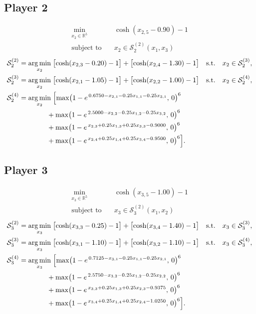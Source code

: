 \documentclass[11pt]{article}
\newcommand{\argmin}{\operatorname*{arg\,min}}
\begin{document}
\subsection*{Player 2}
\[
\begin{aligned}
  \min_{x_2 \in \mathbb{R}^5} \quad & \cosh(x_{2,5}-0.90)-1 \\
  \text{subject to} \quad & x_2 \in \mathcal{S}_2^{(2)}(x_1,x_3)
\end{aligned}
\]
\[
\begin{aligned}
  \mathcal{S}_2^{(2)} &= \argmin_{x_2} \;
    \bigl[\cosh(x_{2,3}-0.20)-1\bigr] + \bigl[\cosh(x_{2,4}-1.30)-1\bigr]
    \quad \text{s.t.} \quad x_2 \in \mathcal{S}_2^{(3)}, \\
  \mathcal{S}_2^{(3)} &= \argmin_{x_2} \;
    \bigl[\cosh(x_{2,1}-1.05)-1\bigr] + \bigl[\cosh(x_{2,2}-1.00)-1\bigr]
    \quad \text{s.t.} \quad x_2 \in \mathcal{S}_2^{(4)}, \\
  \mathcal{S}_2^{(4)} &= \argmin_{x_2} \;
    \Bigl[ \max\bigl(1 - e^{\,0.6750 - x_{2,1} - 0.25x_{1,1} - 0.25x_{3,1}},\,0\bigr)^6 \\
    &\qquad\qquad + \max\bigl(1 - e^{\,2.5000 - x_{2,2} - 0.25x_{1,2} - 0.25x_{3,2}},\,0\bigr)^6 \\
    &\qquad\qquad + \max\bigl(1 - e^{\,x_{2,3} + 0.25x_{1,3} + 0.25x_{3,3} - 0.9000},\,0\bigr)^6 \\
    &\qquad\qquad + \max\bigl(1 - e^{\,x_{2,4} + 0.25x_{1,4} + 0.25x_{3,4} - 0.9500},\,0\bigr)^6 \Bigr].
\end{aligned}
\]

\subsection*{Player 3}
\[
\begin{aligned}
  \min_{x_3 \in \mathbb{R}^5} \quad & \cosh(x_{3,5}-1.00)-1 \\
  \text{subject to} \quad & x_3 \in \mathcal{S}_3^{(2)}(x_1,x_2)
\end{aligned}
\]
\[
\begin{aligned}
  \mathcal{S}_3^{(2)} &= \argmin_{x_3} \;
    \bigl[\cosh(x_{3,3}-0.25)-1\bigr] + \bigl[\cosh(x_{3,4}-1.40)-1\bigr]
    \quad \text{s.t.} \quad x_3 \in \mathcal{S}_3^{(3)}, \\
  \mathcal{S}_3^{(3)} &= \argmin_{x_3} \;
    \bigl[\cosh(x_{3,1}-1.10)-1\bigr] + \bigl[\cosh(x_{3,2}-1.10)-1\bigr]
    \quad \text{s.t.} \quad x_3 \in \mathcal{S}_3^{(4)}, \\
  \mathcal{S}_3^{(4)} &= \argmin_{x_3} \;
    \Bigl[ \max\bigl(1 - e^{\,0.7125 - x_{3,1} - 0.25x_{1,1} - 0.25x_{2,1}},\,0\bigr)^6 \\
    &\qquad\qquad + \max\bigl(1 - e^{\,2.5750 - x_{3,2} - 0.25x_{1,2} - 0.25x_{2,2}},\,0\bigr)^6 \\
    &\qquad\qquad + \max\bigl(1 - e^{\,x_{3,3} + 0.25x_{1,3} + 0.25x_{2,3} - 0.9375},\,0\bigr)^6 \\
    &\qquad\qquad + \max\bigl(1 - e^{\,x_{3,4} + 0.25x_{1,4} + 0.25x_{2,4} - 1.0250},\,0\bigr)^6 \Bigr].
\end{aligned}
\]
\end{document}
